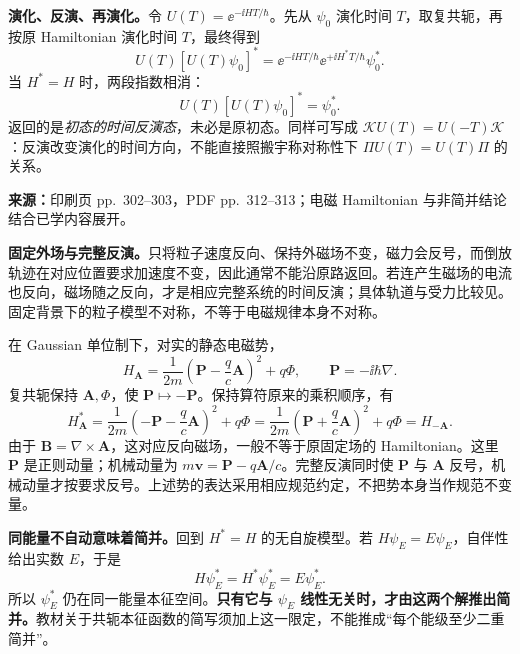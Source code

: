 \textbf{演化、反演、再演化。}令 $U(T)=\ee^{-\ii HT/\hbar}$。先从 $\psi_0$ 演化时间 $T$，取复共轭，再按原 Hamiltonian 演化时间 $T$，最终得到
\begin{equation}
  U(T)[U(T)\psi_0]^*
    =\ee^{-\ii HT/\hbar}\ee^{+\ii H^*T/\hbar}\psi_0^*.
\end{equation}
当 $H^*=H$ 时，两段指数相消：
\begin{equation}
  \boxed{U(T)[U(T)\psi_0]^*=\psi_0^*}.
\end{equation}
返回的是\emph{初态的时间反演态}，未必是原初态。同样可写成 $\mathcal K U(T)=U(-T)\mathcal K$：反演改变演化的时间方向，不能直接照搬宇称对称性下 $\Pi U(T)=U(T)\Pi$ 的关系。

\textbf{来源：}印刷页 pp.~302--303，PDF pp.~312--313；电磁 Hamiltonian 与非简并结论结合已学内容展开。

\textbf{固定外场与完整反演。}只将粒子速度反向、保持外磁场不变，磁力会反号，而倒放轨迹在对应位置要求加速度不变，因此通常不能沿原路返回。若连产生磁场的电流也反向，磁场随之反向，才是相应完整系统的时间反演；具体轨道与受力比较见。固定背景下的粒子模型不对称，不等于电磁规律本身不对称。

在 Gaussian 单位制下，对实的静态电磁势，
\begin{equation}
  H_{\mathbf A}
   =\frac1{2m}\left(\mathbf P-\frac qc\mathbf A\right)^2+q\Phi,
  \qquad \mathbf P=-\ii\hbar\nabla.
\end{equation}
复共轭保持 $\mathbf A,\Phi$，使 $\mathbf P\mapsto-\mathbf P$。保持算符原来的乘积顺序，有
\begin{equation}
  H_{\mathbf A}^*
    =\frac1{2m}\left(-\mathbf P-\frac qc\mathbf A\right)^2+q\Phi
    =\frac1{2m}\left(\mathbf P+\frac qc\mathbf A\right)^2+q\Phi
    =\boxed{H_{-\mathbf A}}.
\end{equation}
由于 $\mathbf B=\nabla\times\mathbf A$，这对应反向磁场，一般不等于原固定场的 Hamiltonian。这里 $\mathbf P$ 是正则动量；机械动量为 $m\mathbf v=\mathbf P-q\mathbf A/c$。完整反演同时使 $\mathbf P$ 与 $\mathbf A$ 反号，机械动量才按要求反号。上述势的表达采用相应规范约定，不把势本身当作规范不变量。

\textbf{同能量不自动意味着简并。}回到 $H^*=H$ 的无自旋模型。若 $H\psi_E=E\psi_E$，自伴性给出实数 $E$，于是
\begin{equation}
  H\psi_E^*=H^*\psi_E^*=E\psi_E^*.
\end{equation}
所以 $\psi_E^*$ 仍在同一能量本征空间。\textbf{只有它与 $\psi_E$ 线性无关时，才由这两个解推出简并。}教材关于共轭本征函数的简写须加上这一限定，不能推成“每个能级至少二重简并”。

